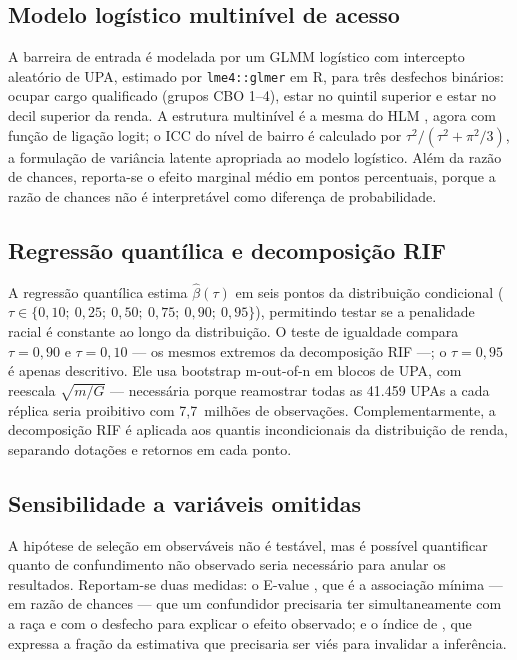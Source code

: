 \documentclass[11pt, a4paper, oneside]{article}
\begin{document}
\subsection*{Modelo logístico multinível de acesso}

A barreira de entrada é modelada por um GLMM logístico com intercepto
aleatório de UPA, estimado por \texttt{lme4::glmer} em R, para três desfechos
binários: ocupar cargo qualificado (grupos CBO 1--4), estar no quintil superior
e estar no decil superior da renda. A estrutura multinível é a mesma do HLM
\cite{raudenbush2002}, agora com função de ligação logit; o ICC do nível de
bairro é calculado por $\tau^2/(\tau^2 + \pi^2/3)$, a formulação de variância
latente apropriada ao modelo logístico. Além da razão de chances, reporta-se o
efeito marginal médio em pontos percentuais, porque a razão de chances não é
interpretável como diferença de probabilidade.

\subsection*{Regressão quantílica e decomposição RIF}

A regressão quantílica \cite{koenker1978} estima $\hat\beta(\tau)$ em seis
pontos da distribuição condicional ($\tau \in \{0{,}10;\ 0{,}25;\ 0{,}50;\
0{,}75;\ 0{,}90;\ 0{,}95\}$), permitindo testar se a penalidade racial é constante ao
longo da distribuição. O teste de igualdade compara $\tau = 0{,}90$ e $\tau = 0{,}10$
--- os mesmos extremos da decomposição RIF ---; o $\tau = 0{,}95$ é apenas descritivo. Ele usa
bootstrap {m-out-of-n} em blocos de UPA, com reescala $\sqrt{m/G}$
\cite{bickel2008} --- necessária porque reamostrar todas as 41.459 UPAs a cada
réplica seria proibitivo com 7{,}7~milhões de observações.
Complementarmente, a decomposição RIF \cite{firpo2018} é aplicada aos quantis
incondicionais da distribuição de renda, separando dotações e retornos em cada
ponto.

\subsection*{Sensibilidade a variáveis omitidas}

A hipótese de seleção em observáveis não é testável, mas é possível quantificar
quanto de confundimento não observado seria necessário para anular os
resultados. Reportam-se duas medidas: o {E-value}
\cite{vanderweele2017}, que é a associação mínima --- em razão de chances ---
que um confundidor precisaria ter simultaneamente com a raça e com o desfecho
para explicar o efeito observado; e o índice de \citeonline{frank2013}, que
expressa a fração da estimativa que precisaria ser viés para invalidar a
inferência.
\end{document}
